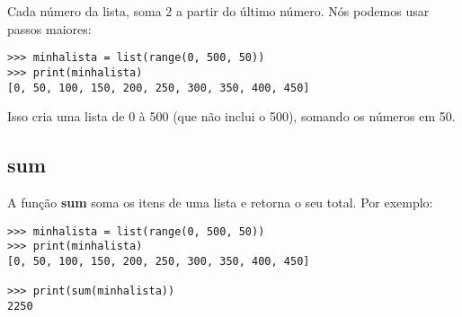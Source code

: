 \noindent
Cada número da lista, soma 2 a partir do último número. Nós podemos usar passos maiores:

\begin{listing}
\begin{verbatim}
>>> minhalista = list(range(0, 500, 50))
>>> print(minhalista)
[0, 50, 100, 150, 200, 250, 300, 350, 400, 450]
\end{verbatim}
\end{listing}

Isso cria uma lista de 0 à 500 (que não inclui o 500), somando os números em 50.

\subsection*{sum}

A função \textbf{sum} soma os itens de uma lista e retorna o seu total. Por exemplo:

\begin{listing}
\begin{verbatim}
>>> minhalista = list(range(0, 500, 50))
>>> print(minhalista)
[0, 50, 100, 150, 200, 250, 300, 350, 400, 450]

>>> print(sum(minhalista))
2250
\end{verbatim}
\end{listing}

\newpage
